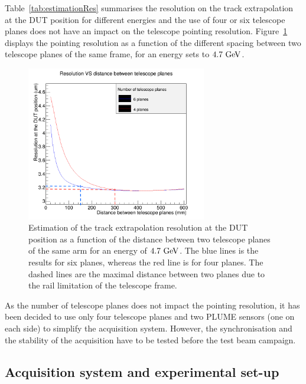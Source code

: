     Table~\ref{tab:estimationRes} summarises the resolution on the track extrapolation at the \gls{DUT} position for different energies and the use of four or six telescope planes does not have an impact on the telescope pointing resolution.
    Figure~\ref{fig:estimationRes4.7GeV} displays the pointing resolution as a function of the different spacing between two telescope planes of the same frame, for an energy sets to $4.7~\rm{GeV}$.

    \begin{figure}[!b]
      \centering
      \includegraphics[width = 0.7\textwidth]{Pictures/X0/resolution_4Vs6planes_4-7GeV.png}
      \caption{Estimation of the track extrapolation resolution at the DUT position as a function of the distance between two telescope planes of the same arm for an energy of $4.7~\rm{GeV}$.
      The blue lines is the results for six planes, whereas the red line is for four planes. 
      The dashed lines are the maximal distance between two planes due to the rail limitation of the telescope frame.}
      \label{fig:estimationRes4.7GeV}
    \end{figure}

    As the number of telescope planes does not impact the pointing resolution, it has been decided to use only four telescope planes and two \gls{PLUME} sensors (one on each side) to simplify the acquisition system.
    However, the synchronisation and the stability of the acquisition have to be tested before the test beam campaign. 

    \subsection{Acquisition system and experimental set-up}
      
